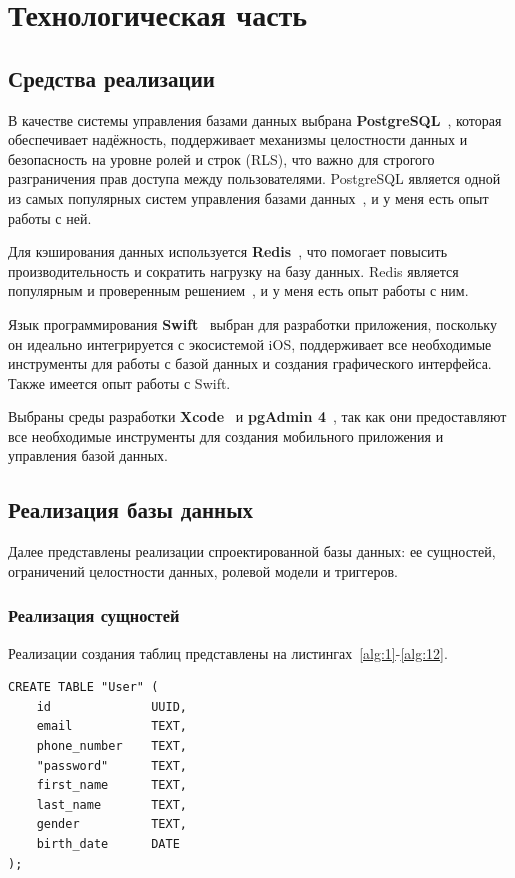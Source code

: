\section{Технологическая часть}

\subsection{Средства реализации}

В качестве системы управления базами данных выбрана  \textbf{PostgreSQL}~\cite{postgresql}, которая обеспечивает надёжность, поддерживает механизмы целостности данных и безопасность на уровне ролей и строк (RLS), что важно для строгого разграничения прав доступа между пользователями. PostgreSQL является одной из самых популярных систем управления базами данных~\cite{DBEnginesRanking}, и у меня есть опыт работы с ней.

Для кэширования данных используется  \textbf{Redis}~\cite{redis}, что помогает повысить производительность и сократить нагрузку на базу данных. Redis является популярным и проверенным решением~\cite{DBEnginesRanking}, и у меня есть опыт работы с ним.

Язык программирования  \textbf{Swift}~\cite{swift} выбран для разработки приложения, поскольку он идеально интегрируется с экосистемой iOS, поддерживает все необходимые инструменты для работы с базой данных и создания графического интерфейса. Также имеется опыт работы с Swift.

Выбраны среды разработки \textbf{Xcode}~\cite{xcode} и \textbf{pgAdmin 4}~\cite{pgadmin4}, так как они предоставляют все необходимые инструменты для создания мобильного приложения и управления базой данных.

\subsection{Реализация базы данных}

Далее представлены реализации спроектированной базы данных: ее сущностей, ограничений целостности данных, ролевой модели и триггеров.

\subsubsection*{Реализация сущностей}

Реализации создания таблиц представлены на листингах~\ref{alg:1}-\ref{alg:12}.

\begin{lstlisting}[label=alg:1, caption=Реализация создания отношения User, captionpos=t]
CREATE TABLE "User" (
	id 				UUID,
	email 			TEXT,
	phone_number 	TEXT,
	"password" 		TEXT,
	first_name 		TEXT,
	last_name 		TEXT,
	gender 			TEXT,
	birth_date 		DATE
);
\end{lstlisting}

